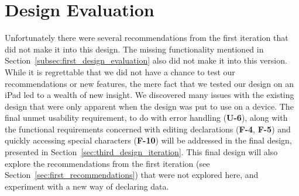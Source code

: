 \section{Design Evaluation}
\label{second_design_evaluation}
Unfortunately there were several recommendations from the first iteration that did not make it into this design. 
The missing functionality mentioned in Section~\ref{subsec:first_design_evaluation} also did not make it into this version.
While it is regrettable that we did not have a chance to test our recommendations or new features, the mere fact that we tested our design on an iPad led to a wealth of new insight.
We discovered many issues with the existing design that were only apparent when the design was put to use on a device. 
The final unmet usability requirement, to do with error handling (\textbf{U-6}), along with the functional requirements concerned with editing declarations (\textbf{F-4}, \textbf{F-5}) and quickly accessing special characters (\textbf{F-10}) will be addressed in the final design, presented in Section~\ref{sec:third_design_iteration}. 
This final design will also explore the recommendations from the first iteration (see Section~\ref{sec:first_recommendations}) that were not explored here, and experiment with a new way of declaring data.
